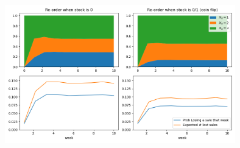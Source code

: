 \begin{solution}
\begin{slide}
		\includegraphics[width=0.75\textwidth]{images/aquarium-sim.png}
	

\end{slide}
	
\end{solution}



